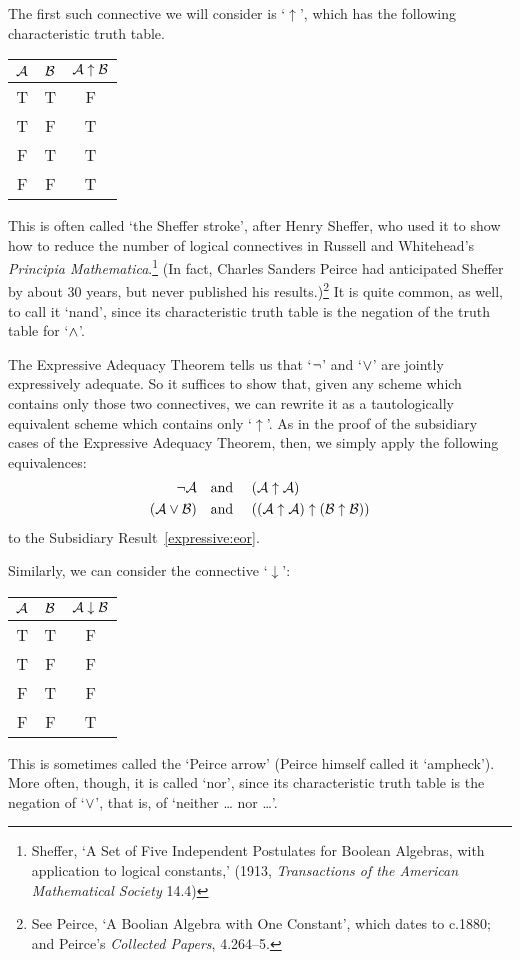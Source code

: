 The first such connective we will consider is `$\uparrow$', which has the following characteristic truth table. 
\begin{center}
\begin{tabular}{c c | c}
$\mathcal{A}$ & $\mathcal{B}$ & $\mathcal{A} \mathrel{\uparrow} \mathcal{B}$\\
\hline
 T & T & F \\
 T & F & T \\
 F & T & T  \\
 F & F & T
\end{tabular}
\end{center}
 This is often called `the Sheffer stroke', after Henry Sheffer, who used it to show how to reduce the number of logical connectives in Russell and Whitehead's \emph{Principia Mathematica}.\footnote{Sheffer, `A Set of Five Independent Postulates for Boolean Algebras, with application to logical constants,' (1913, \emph{Transactions of the American Mathematical Society} 14.4)} (In fact, Charles Sanders Peirce had anticipated Sheffer by about 30 years, but never published his results.)\footnote{See Peirce, `A Boolian Algebra with One Constant', which dates to c.1880; and Peirce's \emph{Collected Papers}, 4.264--5.} It is quite common, as well, to call it `nand', since its characteristic truth table is the negation of the truth table for `$\wedge$'.

The Expressive Adequacy Theorem tells us that `$\neg$' and `$\vee$' are jointly expressively adequate. So it suffices to show that, given any scheme which contains only those two connectives, we can rewrite it as a tautologically equivalent scheme which contains only `$\uparrow$'. As in the proof of the subsidiary cases of the Expressive Adequacy Theorem, then, we simply apply the following equivalences:
		\begin{align*}
			\neg \mathcal{A} &\text{\quad and \quad} (\mathcal{A} \uparrow \mathcal{A})\\
			(\mathcal{A} \vee \mathcal{B}) & \text{\quad and \quad} ((\mathcal{A} \uparrow \mathcal{A}) \uparrow (\mathcal{B} \uparrow \mathcal{B}))
		\end{align*}
to the Subsidiary Result~\ref{expressive:eor}.

Similarly, we can consider the connective `$\downarrow$':
\begin{center}
\begin{tabular}{c c | c}
$\mathcal{A}$ & $\mathcal{B}$ & $\mathcal{A} \mathrel{\downarrow} \mathcal{B}$\\
\hline
 T & T & F \\
 T & F & F  \\
 F & T & F  \\
 F & F & T
\end{tabular}
\end{center}
This is sometimes called the `Peirce arrow' (Peirce himself called it `ampheck'). More often, though, it is called `nor', since its characteristic truth table is the negation of `$\vee$', that is, of `neither \dots{} nor \dots'.


